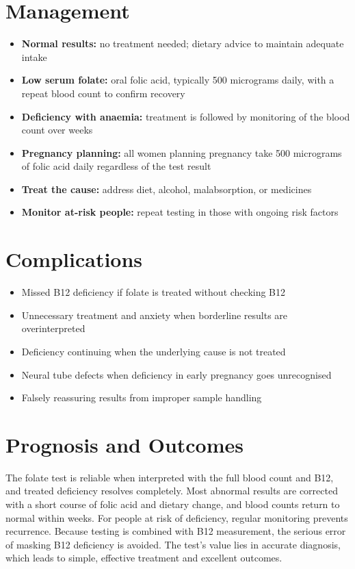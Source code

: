 \section*{Management}
\begin{itemize}
    \item \textbf{Normal results:} no treatment needed; dietary advice to maintain adequate intake
    \item \textbf{Low serum folate:} oral folic acid, typically 500 micrograms daily, with a repeat blood count to confirm recovery
    \item \textbf{Deficiency with anaemia:} treatment is followed by monitoring of the blood count over weeks
    \item \textbf{Pregnancy planning:} all women planning pregnancy take 500 micrograms of folic acid daily regardless of the test result
    \item \textbf{Treat the cause:} address diet, alcohol, malabsorption, or medicines
    \item \textbf{Monitor at-risk people:} repeat testing in those with ongoing risk factors
\end{itemize}

\section*{Complications}
\begin{itemize}
    \item Missed B12 deficiency if folate is treated without checking B12
    \item Unnecessary treatment and anxiety when borderline results are overinterpreted
    \item Deficiency continuing when the underlying cause is not treated
    \item Neural tube defects when deficiency in early pregnancy goes unrecognised
    \item Falsely reassuring results from improper sample handling
\end{itemize}

\section*{Prognosis and Outcomes}
The folate test is reliable when interpreted with the full blood count and B12, and treated deficiency resolves completely. Most abnormal results are corrected with a short course of folic acid and dietary change, and blood counts return to normal within weeks. For people at risk of deficiency, regular monitoring prevents recurrence. Because testing is combined with B12 measurement, the serious error of masking B12 deficiency is avoided. The test's value lies in accurate diagnosis, which leads to simple, effective treatment and excellent outcomes.

